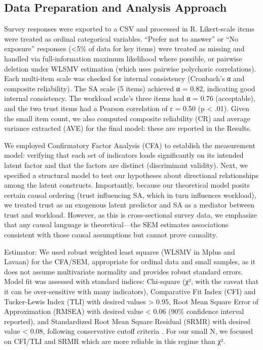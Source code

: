 \documentclass[conference]{IEEEtran}
\begin{document}
\subsection{Data Preparation and Analysis Approach}
Survey responses were exported to a CSV and processed in R. Likert-scale items were treated as ordinal categorical variables. “Prefer not to answer” or “No exposure” responses (<5\% of data for key items) were treated as missing and handled via full-information maximum likelihood where possible, or pairwise deletion under WLSMV estimation (which uses pairwise polychoric correlations). Each multi-item scale was checked for internal consistency (Cronbach’s α and composite reliability). The SA scale (5 items) achieved α = 0.82, indicating good internal consistency. The workload scale’s three items had α = 0.76 (acceptable), and the two trust items had a Pearson correlation of r = 0.50 (p < .01). Given the small item count, we also computed composite reliability (CR) and average variance extracted (AVE) for the final model: these are reported in the Results.

We employed Confirmatory Factor Analysis (CFA) to establish the measurement model: verifying that each set of indicators loads significantly on its intended latent factor and that the factors are distinct (discriminant validity). Next, we specified a structural model to test our hypotheses about directional relationships among the latent constructs. Importantly, because our theoretical model posits certain causal ordering (trust influencing SA, which in turn influences workload), we treated trust as an exogenous latent predictor and SA as a mediator between trust and workload. However, as this is cross-sectional survey data, we emphasize that any causal language is theoretical—the SEM estimates associations consistent with those causal assumptions but cannot prove causality.

Estimator: We used robust weighted least squares (WLSMV in Mplus and Lavaan) for the CFA/SEM, appropriate for ordinal data and small samples, as it does not assume multivariate normality and provides robust standard errors. Model fit was assessed with standard indices: Chi-square (χ², with the caveat that it can be over-sensitive with many indicators), Comparative Fit Index (CFI) and Tucker-Lewis Index (TLI) with desired values > 0.95, Root Mean Square Error of Approximation (RMSEA) with desired value < 0.06 (90\% confidence interval reported), and Standardized Root Mean Square Residual (SRMR) with desired value < 0.08, following conservative cutoff criteria \cite{hu1999cutoff}. For our small N, we focused on CFI/TLI and SRMR which are more reliable in this regime than χ².
\end{document}
